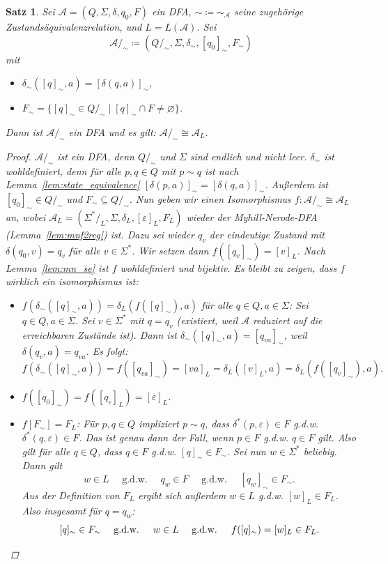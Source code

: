 \documentclass[11pt, a4paper]{article}
\theoremstyle{definition}
\theoremstyle{plain}
\newtheorem{theorem}[definition]{Satz}
\numberwithin{equation}{section}
\let\emptyset\varnothing
\begin{document}
\begin{theorem}\label{thm:se2mindfa}
	Sei $\mathcal{A} = (Q, \Sigma, \delta, q_0, F)$ ein DFA, $\sim \coloneqq \sim_\mathcal{A}$ seine zugehörige Zu\-stands\-ä\-qui\-va\-lenz\-re\-la\-tion, und $L = L(\mathcal{A})$. Sei
	$$
		\mathcal{A}/_\sim \coloneqq (Q/_\sim, \Sigma, \delta_\sim, [q_0]_\sim, F_\sim)
	$$
	mit 
	\begin{itemize}
		\item $\delta_\sim([q]_\sim, a) = [\delta(q, a)]_\sim$,
		\item $F_\sim = \{[q]_\sim \in Q/_\sim \mid [q]_\sim \cap F \neq \emptyset\}$.
	\end{itemize}
	Dann ist $\mathcal{A}/_\sim$ ein DFA und es gilt: $\mathcal{A}/_\sim \cong \mathcal{A}_L$.
	\begin{proof}
		$\mathcal{A}/_\sim$ ist ein DFA, denn $Q/_\sim$ und $\Sigma$ sind endlich und nicht leer. $\delta_\sim$ ist wohldefiniert, denn für alle $p, q \in Q$ mit $p \sim q$ ist nach Lemma~\ref{lem:state_equivalence} $[\delta(p, a)]_\sim = [\delta(q, a)]_\sim$. Außerdem ist $[q_0]_\sim \in Q/_\sim$ und $F_\sim \subseteq Q/_\sim$.
		Nun geben wir einen Isomorphismus $f\colon \mathcal{A}/_\sim \cong \mathcal{A}_L$ an, wobei $\mathcal{A}_L = (\Sigma^\ast/_L, \Sigma, \delta_L, [\varepsilon]_L, F_L)$ wieder der Myhill-Nerode-DFA (Lemma~\ref{lem:mnf2reg}) ist. Dazu sei wieder $q_v$ der eindeutige Zustand mit $\delta(q_0, v) = q_v$ für alle $v \in \Sigma^\ast$. Wir setzen dann $f([q_v]_\sim) = [v]_L$. Nach Lemma~\ref{lem:mn_se} ist $f$ wohldefiniert und bijektiv. Es bleibt zu zeigen, dass $f$ wirklich ein isomorphismus ist:
		\begin{itemize}
			\item $f(\delta_\sim([q]_\sim, a)) = \delta_L(f([q]_\sim), a)$ für alle $q \in Q, a\in \Sigma$: Sei $q \in Q, a \in \Sigma$. Sei $v \in \Sigma^\ast$ mit $q = q_v$ (existiert, weil $\mathcal{A}$ reduziert auf die erreichbaren Zustände ist). Dann ist $\delta_\sim([q]_\sim, a) = [q_{va}]_\sim$, weil $\delta(q_v, a) =q_{va}$. Es folgt:
				$$
					f(\delta_\sim([q]_\sim, a)) = f([q_{va}]_\sim) = [va]_L = \delta_L([v]_L, a) = \delta_L(f([q_v]_\sim), a).
				$$
			\item $f([q_0]_\sim) = f([q_\varepsilon]_L) = [\varepsilon]_L$.
			\item $f[F_\sim] = F_L$: Für $p, q \in Q$ impliziert $p \sim q$, dass $\delta^\ast(p, \varepsilon) \in F$ g.d.w. $\delta^\ast(q, \varepsilon) \in F$. Das ist genau dann der Fall, wenn $p \in F$ g.d.w. $q \in F$ gilt. Also gilt für alle $q \in Q$, dass $q \in F$ g.d.w. $[q]_\sim \in F_\sim$. Sei nun $w \in \Sigma^\ast$ beliebig. Dann gilt
				$$
					w \in L \quad\text{ g.d.w. }\quad q_w \in F \quad\text{ g.d.w. }\quad [q_w]_\sim \in F_\sim.
				$$
				Aus der Definition von $F_L$ ergibt sich außerdem $w \in L$ g.d.w. $[w]_L \in F_L$. Also insgesamt für $q = q_w$:
				\[
					[q]_\sim \in F_\sim \quad\text{ g.d.w. }\quad w \in L \quad\text{ g.d.w. }\quad f([q]_\sim) = [w]_L \in F_L.\qedhere
				\]
		\end{itemize}
	\end{proof}
\end{theorem}
\end{document}
